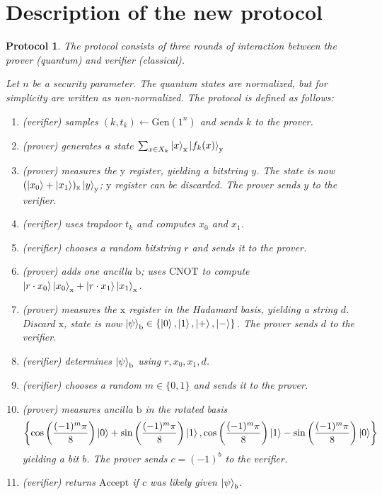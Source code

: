 \documentclass{article}
\newtheorem{protocol}{Protocol}
\begin{document}
\section{Description of the new protocol}
\begin{protocol}\label{protocol}
The protocol consists of three rounds of interaction between the prover (quantum) and verifier (classical). 

Let $n$ be a security parameter. The quantum states are normalized, but for simplicity are written as non-normalized. The protocol is defined as follows:

\begin{enumerate}
    \item (\emph{verifier}) samples $(k,t_{k})\leftarrow \mathrm{Gen}(1^{n})$ and sends $k$ to the prover.
    \item (\emph{prover}) generates a state $\sum_{x\in X_{k}}{\ket{x}_{\mathrm{x}} \ket{f_{k}(x)}_{\mathrm{y}}}$
    \item (\emph{prover}) measures the $\mathrm{y}$ register, yielding a bitstring $y$. The state is now $(\ket{x_{0}}+\ket{x_{1}})_{\mathrm{x}}\ket{y}_{\mathrm{y}}$; $\mathrm{y}$ register can be discarded. The prover sends $y$ to the verifier.
    \item (\emph{verifier}) uses trapdoor $t_{k}$ and computes $x_{0}$ and $x_{1}$.
    \item (\emph{verifier}) chooses a random bitstring $r$ and sends it to the prover.
    \item (\emph{prover}) adds one ancilla $\mathrm{b}$; uses $\mathrm{CNOT}$ to compute $\ket{r\cdot x_{0}}\ket{x_{0}}_{\mathrm{x}}+\ket{r\cdot x_{1}}\ket{x_{1}}_{\mathrm{x}}$.
    \item (\emph{prover}) measures the $\mathrm{x}$ register in the Hadamard basis, yielding a string $d$. Discard $\mathrm{x}$, state is now $\ket{\psi}_{\mathrm{b}}\in\{\ket{0},\ket{1},\ket{+},\ket{-}\}$. The prover sends $d$ to the verifier. \label{hb}
    \item (\emph{verifier}) determines $\ket{\psi}_{\mathrm{b}}$ using $r,x_{0},x_{1},d$.
    \item (\emph{verifier}) chooses a random $m\in \{0, 1\}$ and sends it to the prover.
    \item (\emph{prover}) measures ancilla $\mathrm{b}$ in the rotated basis \begin{align*}\left\{\cos\left(\frac{(-1)^{m}\pi}{8}\right)\ket{0}+\sin\left(\frac{(-1)^{m}\pi}{8}\right)\ket{1}, \cos\left(\frac{(-1)^{m}\pi}{8}\right)\ket{1}-\sin\left(\frac{(-1)^{m}\pi}{8}\right)\ket{0}\right\}\end{align*}  yielding a bit $b$. The prover sends $c=(-1)^{b}$ to the verifier.
    \item (\emph{verifier}) returns $\mathrm{Accept}$ if $c$ was likely given $\ket{\psi}_{b}$. 
\end{enumerate}
\end{protocol}
\end{document}
